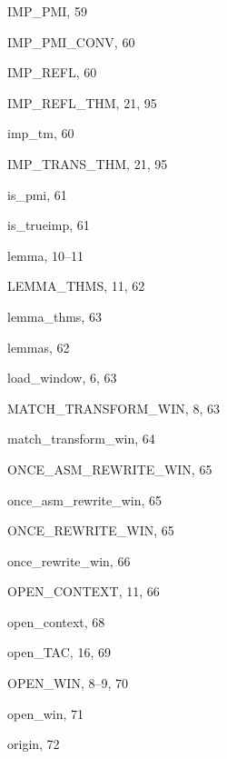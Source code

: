 \begin{theindex}
  \indexspace

  \item {\ptt IMP\_PMI}, 59
  \item {\ptt IMP\_PMI\_CONV}, 60
  \item {\ptt IMP\_REFL}, 60
  \item {\ptt IMP\_REFL\_THM}, 21, 95
  \item {\ptt imp\_tm}, 60
  \item {\ptt IMP\_TRANS\_THM}, 21, 95
  \item {\ptt is\_pmi}, 61
  \item {\ptt is\_trueimp}, 61

  \indexspace

  \item lemma, 10--11
  \item {\ptt LEMMA\_THMS}, 11, 62
  \item {\ptt lemma\_thms}, 63
  \item {\ptt lemmas}, 62
  \item {\ptt load\_window}, 6, 63

  \indexspace

  \item {\ptt MATCH\_TRANSFORM\_WIN}, 8, 63
  \item {\ptt match\_transform\_win}, 64

  \indexspace

  \item {\ptt ONCE\_ASM\_REWRITE\_WIN}, 65
  \item {\ptt once\_asm\_rewrite\_win}, 65
  \item {\ptt ONCE\_REWRITE\_WIN}, 65
  \item {\ptt once\_rewrite\_win}, 66
  \item {\ptt OPEN\_CONTEXT}, 11, 66
  \item {\ptt open\_context}, 68
  \item {\ptt open\_TAC}, 16, 69
  \item {\ptt OPEN\_WIN}, 8--9, 70
  \item {\ptt open\_win}, 71
  \item {\ptt origin}, 72

  \indexspace


\end{theindex}
